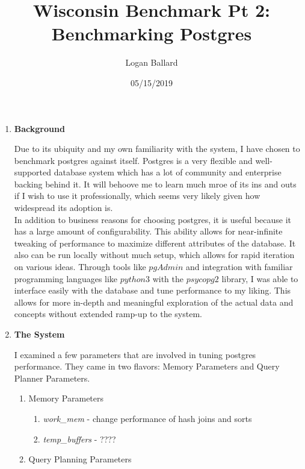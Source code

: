 \documentclass[11pt,letterpaper]{article}
\author{Logan Ballard}
\title{Wisconsin Benchmark Pt 2: Benchmarking Postgres}
\date{05/15/2019}
\begin{document}
\maketitle

\begin{enumerate}
	
\item \textbf{Background}

Due to its ubiquity and my own familiarity with the system, I have chosen to benchmark postgres against itself.   Postgres is a very flexible and well-supported database system which has a lot of community and enterprise backing behind it.  It will behoove me to learn much mroe of its ins and outs if I wish to use it professionally, which seems very likely given how widespread its adoption is.\\

In addition to business reasons for choosing postgres, it is useful because it has a large amount of configurability.  This ability allows for near-infinite tweaking of performance to maximize different attributes of the database.  It also can be run locally without much setup, which allows for rapid iteration on various ideas.  Through tools like $pgAdmin$ and integration with familiar programming languages like $python3$ with the $psycopg2$ library, I was able to interface easily with the database and tune performance to my liking.  This allows for more in-depth and meaningful exploration of the actual data and concepts without extended ramp-up to the system.

\item \textbf{The System}

I examined a few parameters that are involved in tuning postgres performance.  They came in two flavors: Memory Parameters and Query Planner Parameters.

\begin{enumerate}{}
	\item Memory Parameters
	
	\begin{enumerate}
		\item \textit{work\_mem} - change performance of hash joins and sorts
		\item \textit{temp\_buffers} - \large{????}
	\end{enumerate}
	
	\item Query Planning Parameters
	

\end{enumerate}
\end{enumerate}
\end{document}
